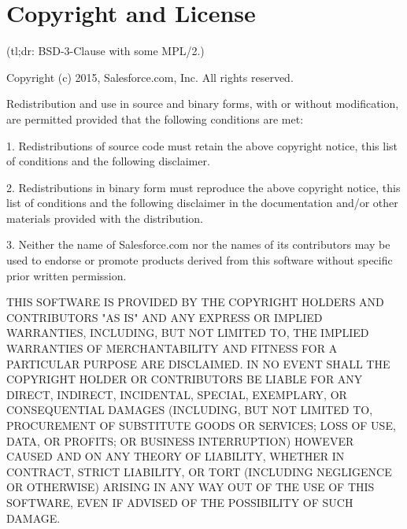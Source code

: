\section*{Copyright and License}

(tl;dr\+: B\+S\+D-\/3-\/\+Clause with some M\+P\+L/2.)


\begin{DoxyCode}
Copyright (c) 2015, Salesforce.com, Inc.
All rights reserved.

Redistribution and use in source and binary forms, with or without
modification, are permitted provided that the following conditions are met:

1. Redistributions of source code must retain the above copyright notice,
this list of conditions and the following disclaimer.

2. Redistributions in binary form must reproduce the above copyright notice,
this list of conditions and the following disclaimer in the documentation
and/or other materials provided with the distribution.

3. Neither the name of Salesforce.com nor the names of its contributors may
be used to endorse or promote products derived from this software without
specific prior written permission.

THIS SOFTWARE IS PROVIDED BY THE COPYRIGHT HOLDERS AND CONTRIBUTORS "AS IS"
AND ANY EXPRESS OR IMPLIED WARRANTIES, INCLUDING, BUT NOT LIMITED TO, THE
IMPLIED WARRANTIES OF MERCHANTABILITY AND FITNESS FOR A PARTICULAR PURPOSE
ARE DISCLAIMED. IN NO EVENT SHALL THE COPYRIGHT HOLDER OR CONTRIBUTORS BE
LIABLE FOR ANY DIRECT, INDIRECT, INCIDENTAL, SPECIAL, EXEMPLARY, OR
CONSEQUENTIAL DAMAGES (INCLUDING, BUT NOT LIMITED TO, PROCUREMENT OF
SUBSTITUTE GOODS OR SERVICES; LOSS OF USE, DATA, OR PROFITS; OR BUSINESS
INTERRUPTION) HOWEVER CAUSED AND ON ANY THEORY OF LIABILITY, WHETHER IN
CONTRACT, STRICT LIABILITY, OR TORT (INCLUDING NEGLIGENCE OR OTHERWISE)
ARISING IN ANY WAY OUT OF THE USE OF THIS SOFTWARE, EVEN IF ADVISED OF THE
POSSIBILITY OF SUCH DAMAGE.
\end{DoxyCode}
 